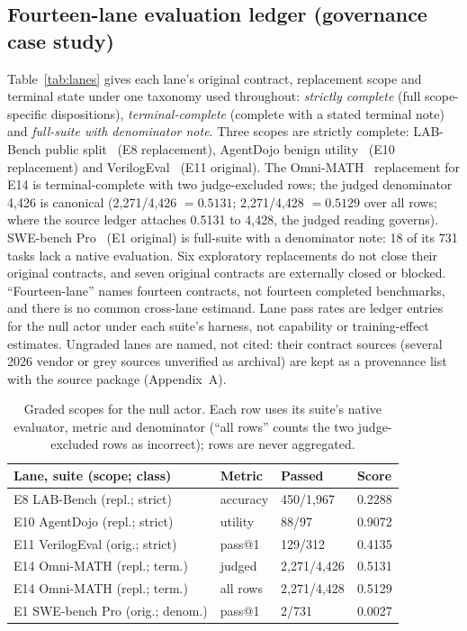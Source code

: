 \documentclass[conference]{IEEEtran}
\begin{document}
\subsection{Fourteen-lane evaluation ledger (governance case study)}
Table~\ref{tab:lanes} gives each lane's original contract, replacement
scope and terminal state under one taxonomy used throughout:
\emph{strictly complete} (full scope-specific dispositions),
\emph{terminal-complete} (complete with a stated terminal note) and
\emph{full-suite with denominator note}. Three scopes are strictly
complete: LAB-Bench public split~\cite{laurent2024labbench} (E8
replacement), AgentDojo benign utility~\cite{debenedetti2024agentdojo} (E10
replacement) and VerilogEval~\cite{liu2023verilogeval} (E11 original). The
Omni-MATH~\cite{gao2024omnimath} replacement for E14 is terminal-complete
with two judge-excluded rows; the judged denominator 4,426 is canonical
(2,271/4,426 $=0.5131$; 2,271/4,428 $=0.5129$ over all rows; where the
source ledger attaches 0.5131 to 4,428, the judged reading governs).
SWE-bench Pro~\cite{deng2025swebenchpro} (E1 original) is full-suite with a
denominator note: 18 of its 731 tasks lack a native evaluation. Six
exploratory replacements do not close their original contracts, and seven
original contracts are externally closed or blocked. ``Fourteen-lane''
names fourteen contracts, not fourteen completed benchmarks, and there is
no common cross-lane estimand. Lane pass rates are ledger entries for the
null actor under each suite's harness, not capability or training-effect
estimates. Ungraded lanes are named, not cited: their contract sources
(several 2026 vendor or grey sources unverified as archival) are kept as a
provenance list with the source package (Appendix~A).

\begin{table}[t]
\caption{Graded scopes for the null actor. Each row uses its suite's native
evaluator, metric and denominator (``all rows'' counts the two
judge-excluded rows as incorrect); rows are never aggregated.}
\label{tab:campaign}
\centering
\footnotesize
\setlength{\tabcolsep}{2pt}
\begin{tabular}{@{}llll@{}}
\toprule
Lane, suite (scope; class) & Metric & Passed & Score \\
\midrule
E8 LAB-Bench (repl.; strict) & accuracy & 450/1,967 & 0.2288 \\
E10 AgentDojo (repl.; strict) & utility & 88/97 & 0.9072 \\
E11 VerilogEval (orig.; strict) & pass@1 & 129/312 & 0.4135 \\
E14 Omni-MATH (repl.; term.) & judged & 2,271/4,426 & 0.5131 \\
E14 Omni-MATH (repl.; term.) & all rows & 2,271/4,428 & 0.5129 \\
E1 SWE-bench Pro (orig.; denom.) & pass@1 & 2/731 & 0.0027 \\
\bottomrule
\end{tabular}
\end{table}
\end{document}
